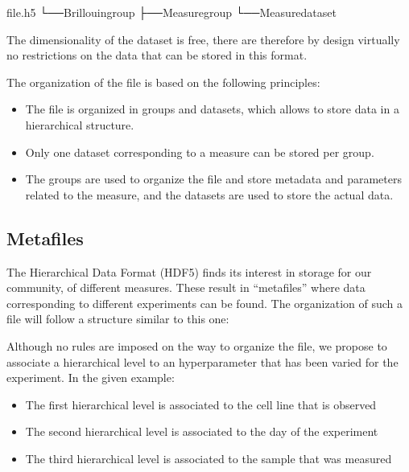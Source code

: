 \documentclass[letterpaper,10pt,english]{sphinxmanual}
\begin{document}
\begin{sphinxVerbatim}[commandchars=\\\{\}]
file.h5
└──Brillouingroup
├──Measuregroup
└──Measuredataset
\end{sphinxVerbatim}

\sphinxAtStartPar
The dimensionality of the dataset is free, there are therefore by design virtually no restrictions on the data that can be stored in this format.

\sphinxAtStartPar
The organization of the file is based on the following principles:
\begin{itemize}
\item {} 
\sphinxAtStartPar
The file is organized in groups and datasets, which allows to store data in a hierarchical structure.

\item {} 
\sphinxAtStartPar
Only one dataset corresponding to a measure can be stored per group.

\item {} 
\sphinxAtStartPar
The groups are used to organize the file and store metadata and parameters related to the measure, and the datasets are used to store the actual data.

\end{itemize}


\subsection{Meta\sphinxhyphen{}files}
\label{\detokenize{source/file_format:meta-files}}
\sphinxAtStartPar
The Hierarchical Data Format (HDF5) finds its interest in storage for our community, of different measures. These result in “meta\sphinxhyphen{}files” where data corresponding to different experiments can be found. The organization of such a file will follow a structure similar to this one:

\sphinxAtStartPar
Although no rules are imposed on the way to organize the file, we propose to associate a hierarchical level to an hyperparameter that has been varied for the experiment. In the given example:
\begin{itemize}
\item {} 
\sphinxAtStartPar
The first hierarchical level is associated to the cell line that is observed

\item {} 
\sphinxAtStartPar
The second hierarchical level is associated to the day of the experiment

\item {} 
\sphinxAtStartPar
The third hierarchical level is associated to the sample that was measured

\end{itemize}
\end{document}
